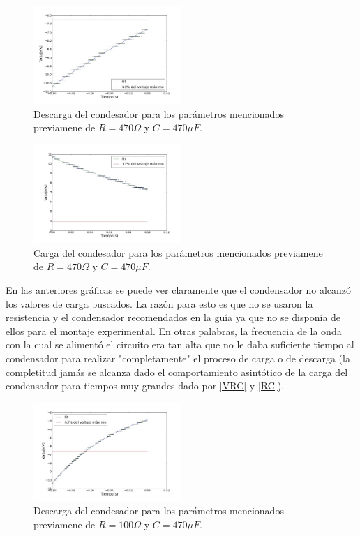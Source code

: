 \documentclass[prb,aps,twocolumn,preprintnumbers,amsmath,amssymb]{revtex4}
\begin{document}
\begin{figure}[h!]
	\centering
	\includegraphics[width=0.5\textwidth,height=0.25\textheight]{carga111}
	\caption{Descarga del condesador para los parámetros mencionados previamene de $R = 470 \Omega$ y $C = 470 \mu F$.}
	\label{fig: carga111}
\end{figure}

\begin{figure}[h!]
	\centering
	\includegraphics[width=0.5\textwidth,height=0.25\textheight]{carga11}
	\caption{Carga del condesador para los parámetros mencionados previamene de $R = 470 \Omega$ y $C = 470 \mu F$.}
	\label{fig: carga11}
\end{figure}

En las anteriores gráficas se puede ver claramente que el condensador no alcanzó los valores de carga buscados. La razón para esto es que no se usaron la resistencia y el condensador recomendados en la guía ya que no se disponía de ellos para el montaje experimental. En otras palabras, la frecuencia de la onda con la cual se alimentó el circuito era tan alta que no le daba suficiente tiempo al condensador para realizar "completamente" el proceso de carga o de descarga (la completitud jamás se alcanza dado el comportamiento asintótico de la carga del condensador para tiempos muy grandes dado por \eqref{VRC} y \eqref{RC}).

\begin{figure}[h!]
	\centering
	\includegraphics[width=0.5\textwidth,height=0.25\textheight]{carga222}
	\caption{Descarga del condesador para los parámetros mencionados previamene de $R = 100 \Omega$ y $C = 470 \mu F$.}
	\label{fig: carga222}
\end{figure}
\end{document}
